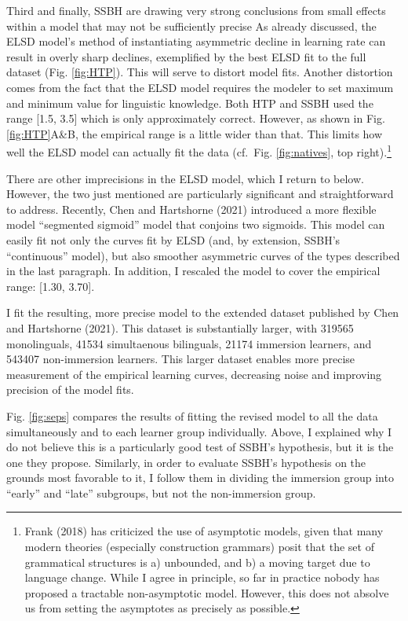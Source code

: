 \documentclass[
  english,
  doc,floatsintext]{apa6}
\begin{document}
Third and finally, SSBH are drawing very strong conclusions from small effects within a model that may not be sufficiently precise As already discussed, the ELSD model's method of instantiating asymmetric decline in learning rate can result in overly sharp declines, exemplified by the best ELSD fit to the full dataset (Fig. \ref{fig:HTP}). This will serve to distort model fits. Another distortion comes from the fact that the ELSD model requires the modeler to set maximum and minimum value for linguistic knowledge. Both HTP and SSBH used the range {[}1.5, 3.5{]} which is only approximately correct. However, as shown in Fig. \ref{fig:HTP}A\&B, the empirical range is a little wider than that. This limits how well the ELSD model can actually fit the data (cf.~Fig. \ref{fig:natives}, top right).\footnote{Frank (2018) has criticized the use of asymptotic models, given that many modern theories (especially construction grammars) posit that the set of grammatical structures is a) unbounded, and b) a moving target due to language change. While I agree in principle, so far in practice nobody has proposed a tractable non-asymptotic model. However, this does not absolve us from setting the asymptotes as precisely as possible.}

There are other imprecisions in the ELSD model, which I return to below. However, the two just mentioned are particularly significant and straightforward to address. Recently, Chen and Hartshorne (2021) introduced a more flexible model ``segmented sigmoid'' model that conjoins two sigmoids. This model can easily fit not only the curves fit by ELSD (and, by extension, SSBH's ``continuous'' model), but also smoother asymmetric curves of the types described in the last paragraph. In addition, I rescaled the model to cover the empirical range: {[}1.30, 3.70{]}.

I fit the resulting, more precise model to the extended dataset published by Chen and Hartshorne (2021). This dataset is substantially larger, with 319565 monolinguals, 41534 simultaenous bilinguals, 21174 immersion learners, and 543407 non-immersion learners. This larger dataset enables more precise measurement of the empirical learning curves, decreasing noise and improving precision of the model fits.

Fig. \ref{fig:seps} compares the results of fitting the revised model to all the data simultaneously and to each learner group individually. Above, I explained why I do not believe this is a particularly good test of SSBH's hypothesis, but it is the one they propose. Similarly, in order to evaluate SSBH's hypothesis on the grounds most favorable to it, I follow them in dividing the immersion group into ``early'' and ``late'' subgroups, but not the non-immersion group.
\end{document}
